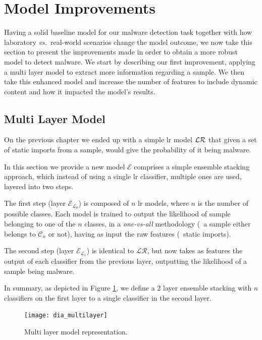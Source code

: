 
\section{Model Improvements}
\label{sec:improvements}

Having a solid baseline model for our malware detection task together with how laboratory \textit{vs.}\ real-world scenarios change the model outcome, we now take this section to present the improvements made in order to obtain a more robust model to detect malware.
We start by describing our first improvement, applying a multi layer model to extract more information regarding a sample.
We then take this enhanced model and increase the number of features to include dynamic content and how it impacted the model's results.

\subsection{Multi Layer Model}
\label{section:improvements_multi_layer}

On the previous chapter we ended up with a simple \gls{lr} model $\mathcal{LR}$ that given a set of static imports from a sample, would give the probability of it being malware.

In this section we provide a new model $\mathcal{E}$ comprises a simple ensemble stacking approach, which instead of using a single \gls{lr} classifier, multiple ones are used, layered into two steps.

The first step (layer $\mathcal{E}_{\mathcal{L}_{0}}$) is composed of $n$ \gls{lr} models, where $n$ is the number of possible classes.
Each model is trained to output the likelihood of sample belonging to one of the $n$ classes, in a \textit{one-vs-all} methodology (\ie\ a sample either belongs to $\mathcal{C}_{n}$ or not), having as input the raw features (\eg\ static imports).

The second step (layer $\mathcal{E}_{\mathcal{L}_{1}}$) is identical to $\mathcal{LR}$, but now takes as features the output of each classifier from the previous layer, outputting the likelihood of a sample being malware.

In summary, as depicted in Figure \ref{fig:dia_multilayer}, we define a 2 layer ensemble stacking with $n$ classifiers on the first layer to a single classifier in the second layer.

\begin{figure}[h]
	\centering
	\texttt{[image: dia\_multilayer]}
	\caption{Multi layer model representation.}
	\label{fig:dia_multilayer}
\end{figure}

